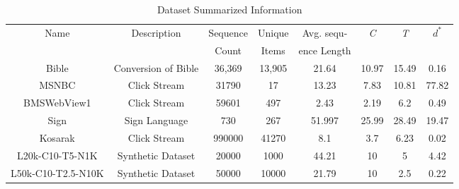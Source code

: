 \begin{table*}[!htb]
\centering
\begin{tabular}{|c|c|c|c|c|c|c|c|}
\hline
Name & Description & Sequence & Unique & Avg. sequ- & \textit{C} & \textit{T} & $d^{*}$\\
& & Count & Items & ence Length & & &\\ 
\hline
Bible & Conversion of Bible & 36,369 & 13,905 & 21.64  &  10.97 & 15.49 & 0.16 \\
\hline
MSNBC & Click Stream & 31790 & 17 & 13.23 & 7.83 & 10.81 & 77.82\\ 
\hline
BMSWebView1 & Click Stream & 59601 & 497 & 2.43 & 2.19 & 6.2 & 0.49\\ 
\hline
Sign & Sign Language & 730 & 267  & 51.997 & 25.99 & 28.49 & 19.47\\ 
\hline
Kosarak & Click Stream & 990000 & 41270 & 8.1 & 3.7 & 6.23 & 0.02\\ 
\hline
L20k-C10-T5-N1K & Synthetic Dataset & 20000 & 1000 & 44.21 &  10 & 5 & 4.42\\ 
\hline
L50k-C10-T2.5-N10K  & Synthetic Dataset &  50000 & 10000  & 21.79 & 10 & 2.5 & 0.22\\ 
\hline
\end{tabular}
\caption{Dataset Summarized Information}
\label{table:dataset_information_summary}
\end{table*}


